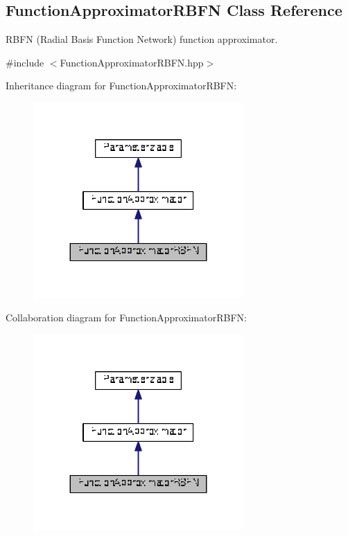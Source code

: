 \hypertarget{classDmpBbo_1_1FunctionApproximatorRBFN}{\subsection{Function\+Approximator\+R\+B\+F\+N Class Reference}
\label{classDmpBbo_1_1FunctionApproximatorRBFN}
}


R\+B\+F\+N (Radial Basis Function Network) function approximator.  




{\ttfamily \#include $<$Function\+Approximator\+R\+B\+F\+N.\+hpp$>$}



Inheritance diagram for Function\+Approximator\+R\+B\+F\+N\+:
\nopagebreak
\begin{figure}[H]
\begin{center}
\leavevmode
\includegraphics[width=227pt]{classDmpBbo_1_1FunctionApproximatorRBFN__inherit__graph}
\end{center}
\end{figure}


Collaboration diagram for Function\+Approximator\+R\+B\+F\+N\+:
\nopagebreak
\begin{figure}[H]
\begin{center}
\leavevmode
\includegraphics[width=227pt]{classDmpBbo_1_1FunctionApproximatorRBFN__coll__graph}
\end{center}
\end{figure}
